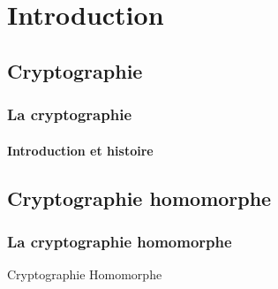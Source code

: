 \section{Introduction}

\subsection{Cryptographie}

\begin{frame}
\frametitle{La cryptographie}
\framesubtitle{Introduction et histoire}
    
\end{frame}

\subsection{Cryptographie homomorphe}

\begin{frame}
\frametitle{La cryptographie homomorphe}
    
\end{frame}

\begin{frame}{Cryptographie Homomorphe}
    
\end{frame}